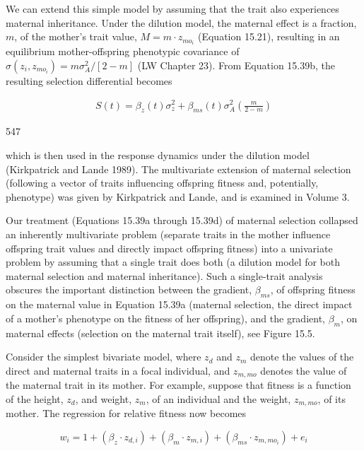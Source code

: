 \documentclass{article}
\begin{document}
We can extend this simple model by assuming that the trait also experiences maternal inheritance. Under the dilution model, the maternal effect is a fraction, $m$, of the mother's trait value, $M = m \cdot z_{mo_i}$ (Equation 15.21), resulting in an equilibrium mother-offspring phenotypic covariance of $\sigma(z_i, z_{mo_i}) = m \sigma_A^2 / [2 - m]$ (LW Chapter 23). From Equation 15.39b, the resulting selection differential becomes

\begin{equation}
\begin{align*}S(t)=\beta_z(t)\sigma_z^2+\beta_{ms}(t)\sigma_A^2\left(\frac{m}{2-m}\right)\end{align*}
\tag{15.39d}
\label{eq:15_39d}
\end{equation}

547

which is then used in the response dynamics under the dilution model (Kirkpatrick and Lande 1989). The multivariate extension of maternal selection (following a vector of traits influencing offspring fitness and, potentially, phenotype) was given by Kirkpatrick and Lande, and is examined in Volume 3.

Our treatment (Equations 15.39a through 15.39d) of maternal selection collapsed an inherently multivariate problem (separate traits in the mother influence offspring trait values and directly impact offspring fitness) into a univariate problem by assuming that a single trait does both (a dilution model for both maternal selection and maternal inheritance). Such a single-trait analysis obscures the important distinction between the gradient,  $ \beta_{ms} $, of offspring fitness on the maternal value in Equation 15.39a (maternal selection, the direct impact of a mother's phenotype on the fitness of her offspring), and the gradient,  $ \beta_{m} $, on maternal effects (selection on the maternal trait itself), see Figure 15.5.

Consider the simplest bivariate model, where  $ z_{d} $ and  $ z_{m} $ denote the values of the direct and maternal traits in a focal individual, and  $ z_{m,mo} $ denotes the value of the maternal trait in its mother. For example, suppose that fitness is a function of the height,  $ z_{d} $, and weight,  $ z_{m} $, of an individual and the weight,  $ z_{m,mo} $, of its mother. The regression for relative fitness now becomes

\begin{equation}
w_{i}=1+\left(\beta_{z}\cdot z_{d,i}\right)+\left(\beta_{m}\cdot z_{m,i}\right)+\left(\beta_{m s}\cdot z_{m,m o_{i}}\right)+e_{i}
\tag{15.40}
\label{eq:15_40}
\end{equation}
\end{document}
